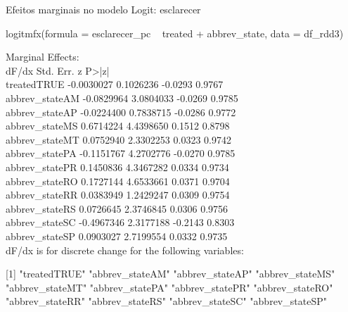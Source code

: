 \documentclass{beamer}
\begin{document}
\begin{frame}{Efeitos marginais no modelo Logit: esclarecer}
	\begin{tiny}
logitmfx(formula = esclarecer_pc ~ treated + abbrev_state, data = df_rdd3)

Marginal Effects:\\
dF/dx  Std. Err.       z  P>|z|\\
treatedTRUE    -0.0030027  0.1026236 -0.0293 0.9767\\
abbrev_stateAM -0.0829964  3.0804033 -0.0269 0.9785\\
abbrev_stateAP -0.0224400  0.7838715 -0.0286 0.9772\\
abbrev_stateMS  0.6714224  4.4398650  0.1512 0.8798\\
abbrev_stateMT  0.0752940  2.3302253  0.0323 0.9742\\
abbrev_statePA -0.1151767  4.2702776 -0.0270 0.9785\\
abbrev_statePR  0.1450836  4.3467282  0.0334 0.9734\\
abbrev_stateRO  0.1727144  4.6533661  0.0371 0.9704\\
abbrev_stateRR  0.0383949  1.2429247  0.0309 0.9754\\
abbrev_stateRS  0.0726645  2.3746845  0.0306 0.9756\\
abbrev_stateSC -0.4967346  2.3177188 -0.2143 0.8303\\
abbrev_stateSP  0.0903027  2.7199554  0.0332 0.9735\\

dF/dx is for discrete change for the following variables:

[1] "treatedTRUE"    "abbrev_stateAM" "abbrev_stateAP" "abbrev_stateMS"\\
[5] "abbrev_stateMT" "abbrev_statePA" "abbrev_statePR" "abbrev_stateRO"\\
[9] "abbrev_stateRR" "abbrev_stateRS" "abbrev_stateSC" "abbrev_stateSP"\\
\end{tiny}
\end{frame}
\end{document}

